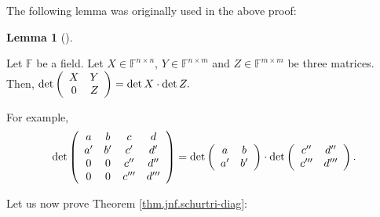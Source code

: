 \documentclass[numbers=enddot,12pt,final,onecolumn,notitlepage]{scrartcl}%
\numberwithin{exer}{subsection}
\theoremstyle{definition}
\newtheorem{lem}[theo]{Lemma}
\newenvironment{lemma}[1][]
{\begin{lem}[#1]\begin{leftbar}}
{\end{leftbar}\end{lem}}
\newenvironment{noncompile}{}{}
\begin{document}
\begin{noncompile}
The following lemma was originally used in the above proof:

\begin{lemma}
Let $\mathbb{F}$ be a field. Let $X\in\mathbb{F}^{n\times n}$, $Y\in
\mathbb{F}^{n\times m}$ and $Z\in\mathbb{F}^{m\times m}$ be three matrices.
Then, $\det\left(
\begin{array}
[c]{cc}%
X & Y\\
0 & Z
\end{array}
\right)  =\det X\cdot\det Z.$
\end{lemma}

For example,%
\[
\det\left(
\begin{array}
[c]{cccc}%
a & b & c & d\\
a^{\prime} & b^{\prime} & c^{\prime} & d^{\prime}\\
0 & 0 & c^{\prime\prime} & d^{\prime\prime}\\
0 & 0 & c^{\prime\prime\prime} & d^{\prime\prime\prime}%
\end{array}
\right)  =\det\left(
\begin{array}
[c]{cc}%
a & b\\
a^{\prime} & b^{\prime}%
\end{array}
\right)  \cdot\det\left(
\begin{array}
[c]{cc}%
c^{\prime\prime} & d^{\prime\prime}\\
c^{\prime\prime\prime} & d^{\prime\prime\prime}%
\end{array}
\right)  .
\]

\end{noncompile}

Let us now prove Theorem \ref{thm.jnf.schurtri-diag}:
\end{document}
